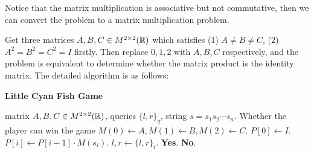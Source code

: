 \begin{answer}
    Notice that the matrix multiplication is associative but not commutative, then we can 
    convert the problem to a matrix multiplication problem.

    Get three matrices $A, B, C \in M^{2\times 2}(\mathbb{R})$ which satisfies (1) $A\neq B \neq C$, (2) $A^2 = B^2 = C^2 = I$ firstly.
    Then replace $0, 1, 2$ with $A, B, C$ respectively, and the problem is equivalent to determine whether the matrix product is the identity matrix.
    The detailed algorithm is as follows:
    \vspace{1em}
    \begin{algo}
        \caption{\textbf{Little Cyan Fish Game}}
        \begin{algorithmic}[1]
            \Require matrix $A, B, C \in M^{2\times 2}(\mathbb{R})$, queries $\{l, r\}_q$, string $s = s_1s_2\cdots s_n$.
            \Ensure Whether the player can win the game 
            \State $M(0) \leftarrow A, M(1) \leftarrow B, M(2) \leftarrow C$.
            \State $P[0] \leftarrow I$. 
                \State $P[i] \leftarrow P[i-1]\cdot M(s_i)$.
            \EndFor
                \State $l, r \leftarrow \{l, r\}_i$.
                   
                    \State \Return \textbf{Yes}.
                \Else
                    \State \Return \textbf{No}.
                \EndIf
            \EndFor
        \end{algorithmic}
    \end{algo}
    \ed
\end{answer}